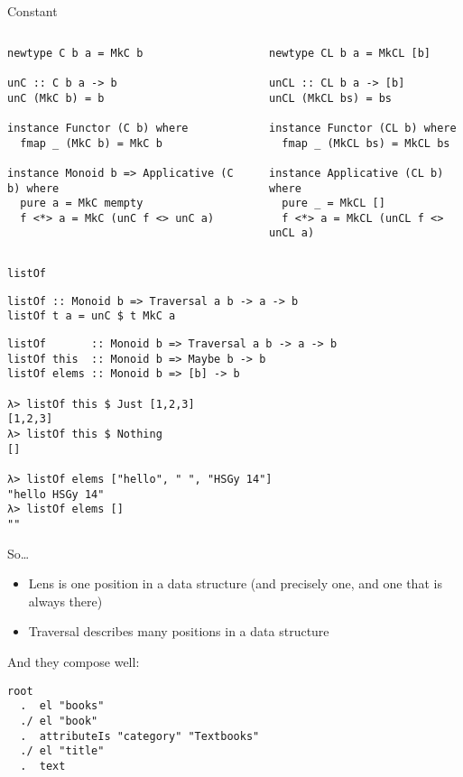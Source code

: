 \documentclass[presentation,aspectratio=169,8pt]{beamer}
\begin{document}
\begin{frame}[label={sec:org028c435},fragile]{Constant}
 \begin{columns}
\begin{column}{0.5\columnwidth}
\begin{verbatim}
newtype C b a = MkC b

unC :: C b a -> b
unC (MkC b) = b

instance Functor (C b) where
  fmap _ (MkC b) = MkC b

instance Monoid b => Applicative (C b) where
  pure a = MkC mempty
  f <*> a = MkC (unC f <> unC a)
\end{verbatim}
\end{column}

\begin{column}{0.5\columnwidth}
\begin{verbatim}
newtype CL b a = MkCL [b]

unCL :: CL b a -> [b]
unCL (MkCL bs) = bs

instance Functor (CL b) where
  fmap _ (MkCL bs) = MkCL bs

instance Applicative (CL b) where
  pure _ = MkCL []
  f <*> a = MkCL (unCL f <> unCL a)
\end{verbatim}
\end{column}
\end{columns}
\end{frame}

\begin{frame}[label={sec:org597dd8e},fragile]{\texttt{listOf}}
 \begin{verbatim}
listOf :: Monoid b => Traversal a b -> a -> b
listOf t a = unC $ t MkC a
\end{verbatim}

\pause

\begin{verbatim}
listOf       :: Monoid b => Traversal a b -> a -> b
listOf this  :: Monoid b => Maybe b -> b
listOf elems :: Monoid b => [b] -> b

λ> listOf this $ Just [1,2,3]
[1,2,3]
λ> listOf this $ Nothing
[]

λ> listOf elems ["hello", " ", "HSGy 14"]
"hello HSGy 14"
λ> listOf elems []
""
\end{verbatim}
\end{frame}

\begin{frame}[label={sec:org0f98314},fragile]{So\ldots{}}
 \begin{itemize}
\item Lens is one position in a data structure (and precisely one, and one that is
always there)
\item Traversal describes many positions in a data structure
\end{itemize}

\pause

And they compose well:

\begin{verbatim}
root
  .  el "books"
  ./ el "book"
  .  attributeIs "category" "Textbooks"
  ./ el "title"
  .  text
\end{verbatim}
\end{frame}
\end{document}
